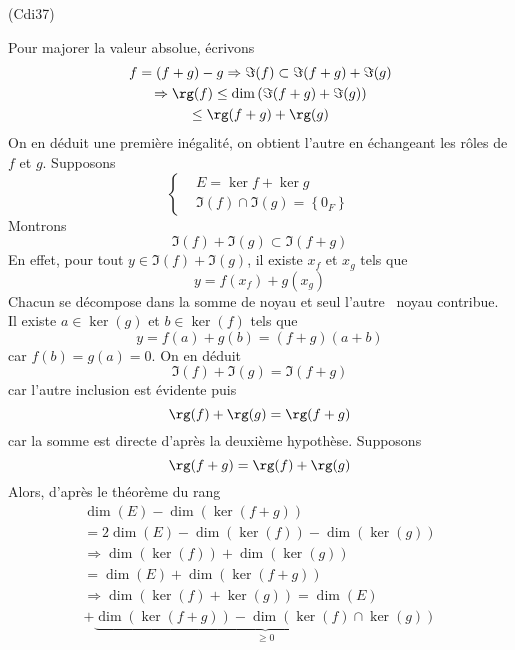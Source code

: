 \begin{tiny}(Cdi37)\end{tiny} Pour majorer la valeur absolue, écrivons
\begin{multline*}
  f = (f+g) - g 
  \Rightarrow \Im(f) \subset \Im(f+g) + \Im(g)\\
  \Rightarrow \rg(f) \leq \dim\left( \Im(f+g) + \Im(g)\right) \\
  \leq \rg(f+g) + \rg(g)
\end{multline*}
On en déduit une première inégalité, on obtient l'autre en échangeant les rôles de $f$ et $g$.\newline
Supposons
\begin{displaymath}
\left\lbrace 
\begin{aligned}
    &E = \ker f + \ker g \\ &\Im(f) \cap \Im(g) = \left\lbrace 0_F\right\rbrace 
  \end{aligned}
  \right.  
\end{displaymath}
Montrons
\begin{displaymath}
  \Im(f) + \Im(g) \subset \Im(f+g)
\end{displaymath}
En effet, pour tout $y \in \Im(f) + \Im(g)$, il existe $x_f$ et $x_g$ tels que
\begin{displaymath}
  y = f(x_f) + g(x_g)
\end{displaymath}
Chacun se décompose dans la somme de noyau et seul \og l'autre\fg~ noyau contribue. Il existe $a\in \ker(g)$ et $b\in \ker(f)$ tels que
\begin{displaymath}
  y = f(a) + g(b) = (f+g)(a+b)
\end{displaymath}
car $f(b)=g(a)=0$.\newline
On en déduit 
\begin{displaymath}
  \Im(f) + \Im(g) = \Im(f+g)
\end{displaymath}
car l'autre inclusion est évidente puis
\begin{displaymath}
  \rg(f) + \rg(g) = \rg(f+g)
\end{displaymath}
car la somme est directe d'après la deuxième hypothèse.\newline
Supposons 
\begin{displaymath}
  \rg(f+g) = \rg(f) + \rg(g)
\end{displaymath}
Alors, d'après le théorème du rang
\begin{multline*}
\dim(E) - \dim\left( \ker(f+g)\right)\\
= 2\dim(E)- \dim(\ker(f)) - \dim(\ker(g)) \\
\Rightarrow
\dim(\ker(f)) + \dim(\ker(g)) \\
= \dim(E) + \dim\left( \ker(f+g)\right) \\
\Rightarrow
\dim\left( \ker(f) + \ker(g)\right)
=\dim(E) \\
+ \underset{\geq 0}{\underbrace{\dim\left( \ker(f+g)\right) - \dim\left( \ker(f) \cap \ker(g)\right) }}
\end{multline*}
